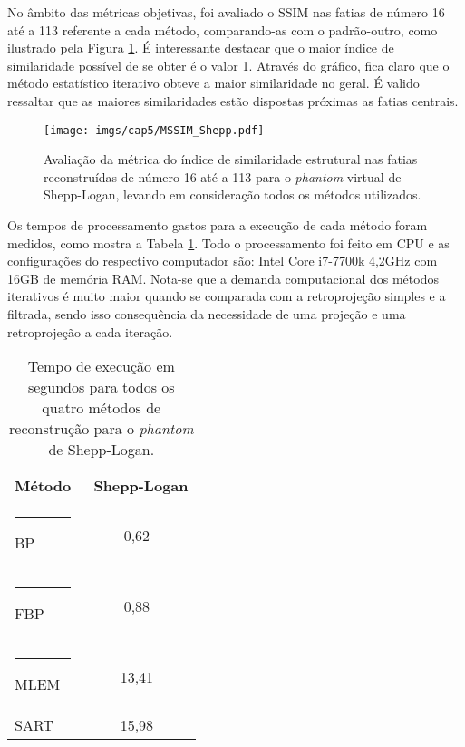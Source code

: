 No âmbito das métricas objetivas, foi avaliado o \acs{SSIM} nas fatias de número 16 até a 113 referente a cada método, comparando-as com o padrão-outro, como ilustrado pela Figura \ref{fig:imgCap6MSSIM}. É interessante destacar que o maior índice de similaridade possível de se obter é o valor 1. Através do gráfico, fica claro que o método estatístico iterativo obteve a maior similaridade no geral. É valido ressaltar que as maiores similaridades estão dispostas próximas as fatias centrais.

\begin{figure}[!h]
	\caption{Avaliação da métrica do índice de similaridade estrutural nas fatias reconstruídas de número 16 até a 113 para o \textit{phantom} virtual de Shepp-Logan, levando em consideração todos os métodos utilizados.}
	\begin{center}
		\texttt{[image: imgs/cap5/MSSIM\_Shepp.pdf]}
	\end{center}
	\label{fig:imgCap6MSSIM}
\end{figure}

Os tempos de processamento gastos para a execução de cada método foram medidos, como mostra a Tabela \ref{tab:tabCap6TimeSheppLogan}. Todo o processamento foi feito em \acs{CPU} e as configurações do respectivo computador são: Intel Core i7-7700k 4,2GHz com 16GB de memória RAM. Nota-se que a demanda computacional dos métodos iterativos é muito maior quando se comparada com a retroprojeção simples e a filtrada, sendo isso consequência da necessidade de uma projeção e uma retroprojeção a cada iteração. 

\begin{table}[!ht]
	\centering
	\caption{Tempo de execução em segundos para todos os quatro métodos de reconstrução para o \textit{phantom} de Shepp-Logan.}
	\label{tab:tabCap6TimeSheppLogan}
	\begin{tabular}{l|c}
		\textbf{Método}	     & \ \textbf{Shepp-Logan} \\ 
		\hline
		\hline
		\rule[-0.5ex]{-3pt}{3ex}
		BP 	 		& 0,62 									\\ 
		\hline
		\rule[-0.5ex]{-3pt}{3ex}
		FBP			& 0,88 									\\
		\hline
		\rule[-0.5ex]{-3pt}{3ex}
		MLEM		& 13,41 								\\
		\hline
		SART		& 15,98 								\\
		\hline
	\end{tabular}
	\vspace{2ex}
\end{table}


